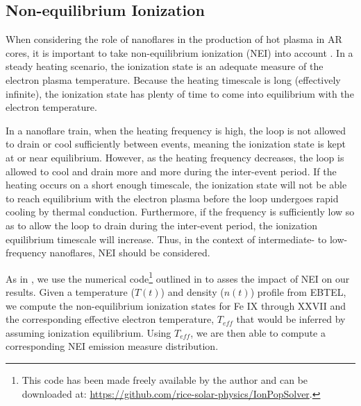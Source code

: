 \documentclass[apj]{emulateapj}
\begin{document}
	\subsection{Non-equilibrium Ionization}
	\label{subsec:nei}
	\par When considering the role of nanoflares in the production of hot plasma in AR cores, it is important to take non-equilibrium ionization (NEI) into account \citep{bradshaw_explosive_2006,reale_nonequilibrium_2008}. In a steady heating scenario, the ionization state is an adequate measure of the electron plasma temperature. Because the heating timescale is long (effectively infinite), the ionization state has plenty of time to come into equilibrium with the electron temperature. 
	\par In a nanoflare train, when the heating frequency is high, the loop is not allowed to drain or cool sufficiently between events, meaning the ionization state is kept at or near equilibrium. However, as the heating frequency decreases, the loop is allowed to cool and drain more and more during the inter-event period. If the heating occurs on a short enough timescale, the ionization state will not be able to reach equilibrium with the electron plasma before the loop undergoes rapid cooling by thermal conduction. Furthermore, if the frequency is sufficiently low so as to allow the loop to drain during the inter-event period, the ionization equilibrium timescale will increase. Thus, in the context of intermediate- to low-frequency nanoflares, NEI should be considered.
	\par As in , we use the numerical code\footnote{This code has been made freely available by the author and can be downloaded at: \url{https://github.com/rice-solar-physics/IonPopSolver}.} outlined in \citet{bradshaw_numerical_2009} to asses the impact of NEI on our results. Given a temperature ($T(t)$) and density ($n(t)$) profile from EBTEL, we compute the non-equilibrium ionization states for Fe IX through XXVII and the corresponding effective electron temperature, $T_{eff}$ that would be inferred by assuming ionization equilibrium. Using $T_{eff}$, we are then able to compute a corresponding NEI emission measure distribution.
\end{document}
